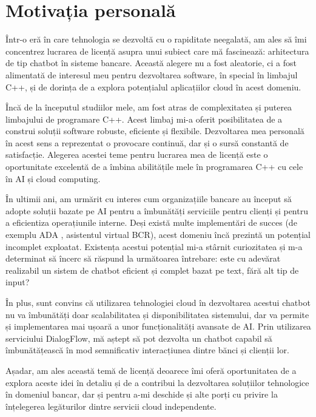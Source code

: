 \section{Motivația personală}

Într-o eră în care tehnologia se dezvoltă cu o rapiditate neegalată, am ales să îmi concentrez lucrarea de licență asupra unui subiect care mă fascinează: arhitectura de tip chatbot în sisteme bancare. Această alegere nu a fost aleatorie, ci a fost alimentată de interesul meu pentru dezvoltarea software, în special în limbajul C++, și de dorința de a explora potențialul aplicațiilor cloud în acest domeniu.

Încă de la începutul studiilor mele, am fost atras de complexitatea și puterea limbajului de programare C++. Acest limbaj mi-a oferit posibilitatea de a construi soluții software robuste, eficiente și flexibile. Dezvoltarea mea personală în acest sens a reprezentat o provocare continuă, dar și o sursă constantă de satisfacție. Alegerea acestei teme pentru lucrarea mea de licență este o oportunitate excelentă de a îmbina abilitățile mele în programarea C++ cu cele în AI și cloud computing.

În ultimii ani, am urmărit cu interes cum organizațiile bancare au început să adopte soluții bazate pe AI pentru a îmbunătăți serviciile pentru clienți și pentru a eficientiza operațiunile interne. Deși există multe implementări de succes (de exemplu ADA \cite{ADA}, asistentul virtual BCR), acest domeniu încă prezintă un potențial incomplet exploatat. Existența acestui potențial mi-a stârnit curiozitatea și m-a determinat să încerc să răspund la următoarea întrebare: este cu adevărat realizabil un sistem de chatbot eficient și complet bazat pe text, fără alt tip de input?

În plus, sunt convins că utilizarea tehnologiei cloud în dezvoltarea acestui chatbot nu va îmbunătăți doar scalabilitatea și disponibilitatea sistemului, dar va permite și implementarea mai ușoară a unor funcționalități avansate de AI. Prin utilizarea serviciului DialogFlow, mă aștept să pot dezvolta un chatbot capabil să îmbunătățească în mod semnificativ interacțiunea dintre bănci și clienții lor.

Așadar, am ales această temă de licență deoarece îmi oferă oportunitatea de a explora aceste idei în detaliu și de a contribui la dezvoltarea soluțiilor tehnologice în domeniul bancar, dar și pentru a-mi deschide și alte porți cu privire la înțelegerea legăturilor dintre servicii cloud independente.

